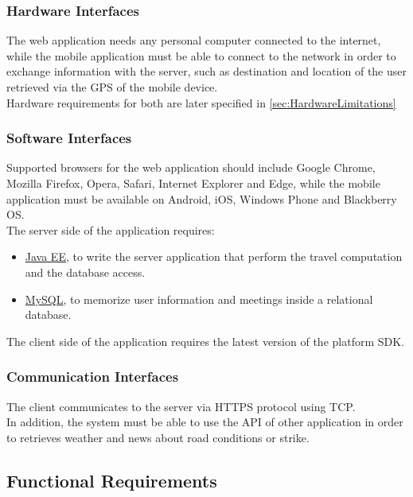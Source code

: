 \subsubsection{Hardware Interfaces}
The web application needs any personal computer connected to the internet, while the mobile application must be able to connect to the network in order to exchange information with the server, such as destination and location of the user retrieved via the GPS of the mobile device.\\
Hardware requirements for both are later specified in \autoref{sec:HardwareLimitations}
\clearpage
\subsubsection{Software Interfaces}
\label{sec:SoftwareInterfaces}
Supported browsers for the web application should include Google Chrome, Mozilla Firefox, Opera, Safari, Internet Explorer and Edge, while the mobile application must be available on Android, iOS, Windows Phone and Blackberry OS.\\
The server side of the application requires: 
\begin{itemize}
	\item \href{http://www.oracle.com/technetwork/java/javaee/overview/index.html}{Java EE}, to write the server application that perform the travel computation and the database access.
	\item \href{https://dev.mysql.com/}{MySQL}, to memorize user information and meetings inside a relational database.
\end{itemize}
The client side of the application requires the latest version of the platform SDK.
\subsubsection{Communication Interfaces}
The client communicates to the server via HTTPS protocol using TCP.\\
In addition, the system must be able to use the API of other application in order to retrieves weather and news about road conditions or strike.
\subsection{Functional Requirements}
